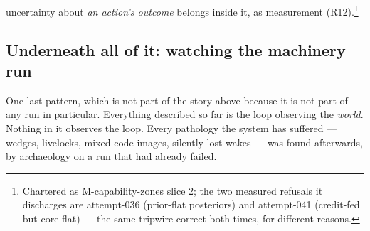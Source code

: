 uncertainty about \emph{an action's outcome} belongs inside it, as measurement (R12).\footnote{Chartered as M-capability-zones slice 2; the two measured refusals it discharges are attempt-036 (prior-flat posteriors) and attempt-041 (credit-fed but core-flat) --- the same tripwire correct both times, for different reasons.}


\subsection*{Underneath all of it: watching the machinery run}

One last pattern, which is not part of the story above because it is not part of
any run in particular.  Everything described so far is the loop observing the
\emph{world}.  Nothing in it observes the loop.  Every pathology the system has
suffered --- wedges, livelocks, mixed code images, silently lost wakes --- was
found afterwards, by archaeology on a run that had already failed.

\hypertarget{pat-r20}{}
